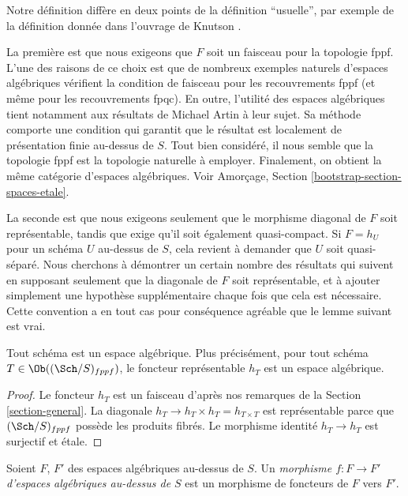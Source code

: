\noindent
Notre définition diffère en deux points de la définition ``usuelle'', par exemple de la
définition donnée dans l'ouvrage de Knutson \cite{Kn}.

\medskip\noindent
La première est que nous exigeons que $F$ soit un faisceau pour la topologie fppf.
L'une des raisons de ce choix est que de nombreux exemples naturels
d'espaces algébriques vérifient la condition de faisceau pour les recouvrements fppf
(et même pour les recouvrements fpqc). En outre, l'utilité des espaces
algébriques tient notamment aux résultats de Michael Artin à leur sujet.
Sa méthode comporte une condition qui garantit que le résultat est
localement de présentation finie au-dessus de $S$.
Tout bien considéré, il nous semble que la topologie fppf
est la topologie naturelle à employer. Finalement, on obtient
la même catégorie d'espaces algébriques. Voir
Amorçage, Section \ref{bootstrap-section-spaces-etale}.

\medskip\noindent
La seconde est que nous exigeons seulement que le morphisme diagonal de $F$ soit
représentable, tandis que \cite{Kn} exige qu'il soit également
quasi-compact. Si $F = h_U$ pour un schéma $U$ au-dessus de $S$,
cela revient à demander que $U$ soit quasi-séparé.
Nous cherchons à démontrer un certain
nombre des résultats qui suivent en supposant seulement que la diagonale
de $F$ soit représentable, et à ajouter simplement une hypothèse supplémentaire chaque fois que
cela est nécessaire. Cette convention a en tout cas pour conséquence agréable que
le lemme suivant est vrai.

\begin{lemma}
\label{lemma-scheme-is-space}
Tout schéma est un espace algébrique. Plus précisément,
pour tout schéma $T \in \Ob((\Sch/S)_{fppf})$,
le foncteur représentable $h_T$ est un espace algébrique.
\end{lemma}

\begin{proof}
Le foncteur $h_T$ est un faisceau d'après nos remarques de la Section \ref{section-general}.
La diagonale $h_T \to h_T \times h_T = h_{T \times T}$ est
représentable parce que $(\Sch/S)_{fppf}$ possède les produits fibrés.
Le morphisme identité $h_T \to h_T$ est surjectif et \'etale.
\end{proof}

\begin{definition}
\label{definition-morphism-algebraic-spaces}
Soient $F$, $F'$ des espaces algébriques au-dessus de $S$.
Un {\it morphisme $f : F \to F'$ d'espaces algébriques au-dessus de $S$}
est un morphisme de foncteurs de $F$ vers $F'$.
\end{definition}

